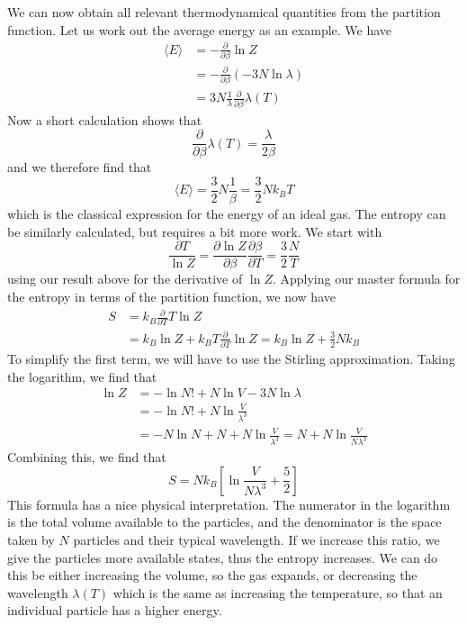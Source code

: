 \documentclass[a4paper, draft]{report}
\numberwithin{section}{chapter}
\numberwithin{equation}{chapter}
\theoremstyle{own}
\theoremstyle{remark}
\begin{document}
We can now obtain all relevant thermodynamical quantities from the partition function. Let us work out the average energy as an example. We have
\begin{align*}
\langle E \rangle  &= - \frac{\partial}{\partial \beta} \ln Z \\
&= - \frac{\partial}{\partial \beta} (-3N \ln \lambda) \\
&= 3N \frac{1}{\lambda} \frac{\partial}{\partial \beta} \lambda(T)
\end{align*}
Now a short calculation shows that
$$
\frac{\partial}{\partial \beta} \lambda(T) = \frac{\lambda}{2\beta}
$$
and we therefore find that
$$
\langle E \rangle = \frac{3}{2} N \frac{1}{\beta} = \frac{3}{2} N k_B T
$$
which is the classical expression for the energy of an ideal gas. The entropy can be similarly calculated, but requires a bit more work. We start with
$$
\frac{\partial T}{\ln Z} = \frac{\partial \ln Z}{\partial \beta}
\frac{\partial \beta}{\partial T} = \frac{3}{2}  \frac{N}{T}
$$
using our result above for the derivative of $\ln Z$. Applying our master formula for the entropy in terms of the partition function, we now have
\begin{align*}
S &= k_B \frac{\partial }{\partial T} T \ln Z \\
&= k_B \ln Z + k_B T \frac{\partial }{\partial T} \ln Z 
= k_B \ln Z + \frac{3}{2} N k_B 
\end{align*}
To simplify the first term, we will have to use the Stirling approximation. Taking the logarithm, we find that
\begin{align*}
\ln Z  &= - \ln N! + N \ln V - 3N \ln \lambda \\
& = - \ln N! + N \ln \frac{V}{\lambda^3} \\
&= - N \ln N + N + N \ln \frac{V}{\lambda^3} = N + N \ln \frac{V}{N \lambda^3}
\end{align*}
Combining this, we find that
$$
S = N k_B \left[ \ln \frac{V}{N \lambda^3} + \frac{5}{2} \right]
$$
This formula has a nice physical interpretation. The numerator in the logarithm is the total volume available to the particles, and the denominator is the space taken by $N$ particles and their typical wavelength. If we increase this ratio, we give the particles more available states, thus the entropy increases. We can do this be either increasing the volume, so the gas expands, or decreasing the wavelength $\lambda(T)$ which is the same as increasing the temperature, so that an individual particle has a higher energy. 
\end{document}
